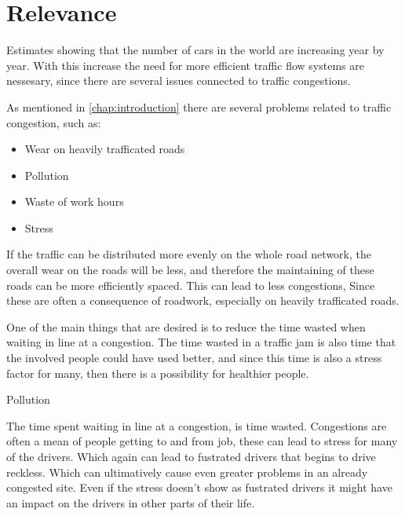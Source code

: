 \section{Relevance}
Estimates showing that the number of cars in the world are increasing year by year.\cite{http://wardsauto.com/ar/world_vehicle_population_110815} With this increase the need for more efficient traffic flow systems are nessesary, since there are several issues connected to traffic congestions.

As mentioned in \ref{chap:introduction} there are several problems related to traffic congestion, such as:
\begin{itemize}
	\item Wear on heavily trafficated roads
	\item Pollution
	\item Waste of work hours
	\item Stress
\end{itemize}

If the traffic can be distributed more evenly on the whole road network, the overall wear on the roads will be less, and therefore the maintaining of these roads can be more efficiently spaced. This can lead to less congestions, Since these are often a consequence of roadwork, especially on heavily trafficated roads.

One of the main things that are desired is to reduce the time wasted when waiting in line at a congestion.
The time wasted in a traffic jam is also time that the involved people could have used better, and since this time is also a stress factor for many, then there is a possibility for healthier people. 

Pollution

The time spent waiting in line at a congestion, is time wasted. Congestions are often a mean of people getting to and from job, these can lead to stress for many of the drivers.\cite{stress,http://psycnet.apa.org/journals/apl/63/4/467.pdf} Which again can lead to fustrated drivers that begins to drive reckless.\cite{http://www.sciencedirect.com/science/article/pii/S1369847899000029} Which can ultimatively cause even greater problems in an already congested site. Even if the stress doesn't show as fustrated drivers it might have an impact on the drivers in other parts of their life.